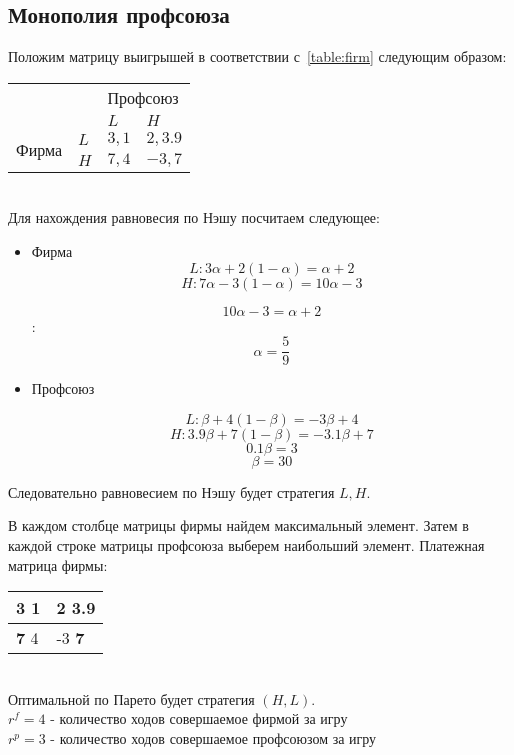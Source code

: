 \subsection{Монополия профсоюза}
Положим матрицу выигрышей в соответствии с~\ref{table:firm} следующим образом:
\begin{table}[h]
	
	\centering
	\begin{tabular}{|l|l|l|l|}
		\hline
		\multicolumn{2}{|l|}{\multirow{2}{*}{}} & \multicolumn{2}{l|}{Профсоюз} \\ \cline{3-4} 
		\multicolumn{2}{|l|}{}                  & $L$            & $H$            \\ \hline
		\multirow{2}{*}{Фирма}     & $L$     & $3, 1$          & $2, 3.9$          \\ \cline{2-4} 
		& $H$     & $7, 4$          & $-3, 7$          \\ \hline
	\end{tabular}
	
\end{table}\\
Для нахождения равновесия по Нэшу посчитаем следующее: 
\begin{itemize}
\item Фирма
	$$ L:  3\alpha + 2(1-\alpha)=\alpha + 2$$
	$$ H: 7\alpha - 3(1-\alpha)=10\alpha - 3$$
	
	$$10\alpha - 3 = \alpha+2 $$:
	$$\alpha = \frac{5}{9} $$
	
\item Профсоюз
	
	 $$L: \beta + 4(1-\beta)=-3\beta + 4$$
	 $$H: 3.9\beta + 7(1-\beta)=-3.1\beta +7$$
	$$0.1\beta  = 3 $$
	$$\beta = 30 $$
	
	
\end{itemize}

Следовательно равновесием по Нэшу будет стратегия $L,H$.

В каждом столбце матрицы фирмы найдем максимальный элемент. 
Затем в каждой строке матрицы профсоюза выберем наибольший элемент.
Платежная матрица фирмы:\\
\begin{table}[h]
	\centering
	\begin{tabular}{|l|l|}
		\hline
		3 1 & \textbf{2 3.9}  \\ \hline
		\textbf{7} 4 & -3 \textbf{7} \\ \hline
	\end{tabular}
\end{table}\\
Оптимальной по Парето будет стратегия $(H,L)$.\\
$r^f= 4 $ - количество ходов совершаемое фирмой за игру\\
$r^p= 3 $ - количество ходов совершаемое профсоюзом за игру\\ \\

